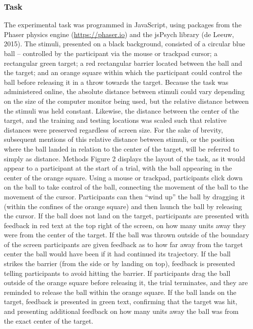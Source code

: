 \documentclass[
  man,floatsintext]{apa7}
\begin{document}
\hypertarget{task}{%
\subsubsection{Task}\label{task}}

The experimental task was programmed in JavaScript, using packages from the Phaser physics engine (\url{https://phaser.io}) and the jsPsych library (de Leeuw, 2015). The stimuli, presented on a black background, consisted of a circular blue ball -- controlled by the participant via the mouse or trackpad cursor; a rectangular green target; a red rectangular barrier located between the ball and the target; and an orange square within which the participant could control the ball before releasing it in a throw towards the target. Because the task was administered online, the absolute distance between stimuli could vary depending on the size of the computer monitor being used, but the relative distance between the stimuli was held constant. Likewise, the distance between the center of the target, and the training and testing locations was scaled such that relative distances were preserved regardless of screen size. For the sake of brevity, subsequent mentions of this relative distance between stimuli, or the position where the ball landed in relation to the center of the target, will be referred to simply as distance. Methods Figure 2 displays the layout of the task, as it would appear to a participant at the start of a trial, with the ball appearing in the center of the orange square.
Using a mouse or trackpad, participants click down on the ball to take control of the ball, connecting the movement of the ball to the movement of the cursor. Participants can then ``wind up'' the ball by dragging it (within the confines of the orange square) and then launch the ball by releasing the cursor. If the ball does not land on the target, participants are presented with feedback in red text at the top right of the screen, on how many units away they were from the center of the target. If the ball was thrown outside of the boundary of the screen participants are given feedback as to how far away from the target center the ball would have been if it had continued its trajectory. If the ball strikes the barrier (from the side or by landing on top), feedback is presented telling participants to avoid hitting the barrier. If participants drag the ball outside of the orange square before releasing it, the trial terminates, and they are reminded to release the ball within the orange square. If the ball lands on the target, feedback is presented in green text, confirming that the target was hit, and presenting additional feedback on how many units away the ball was from the exact center of the target.
\end{document}

